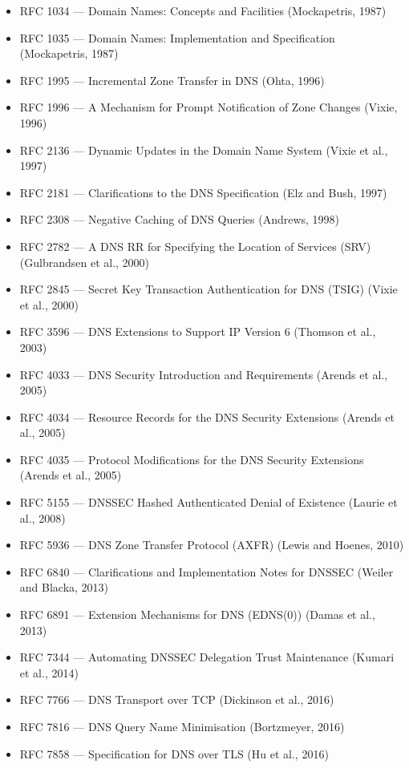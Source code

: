 \documentclass[11pt,letterpaper]{article}
\begin{document}
\begin{itemize}
  \item RFC 1034 --- Domain Names: Concepts and Facilities (Mockapetris, 1987)
  \item RFC 1035 --- Domain Names: Implementation and Specification (Mockapetris, 1987)
  \item RFC 1995 --- Incremental Zone Transfer in DNS (Ohta, 1996)
  \item RFC 1996 --- A Mechanism for Prompt Notification of Zone Changes (Vixie, 1996)
  \item RFC 2136 --- Dynamic Updates in the Domain Name System (Vixie et al., 1997)
  \item RFC 2181 --- Clarifications to the DNS Specification (Elz and Bush, 1997)
  \item RFC 2308 --- Negative Caching of DNS Queries (Andrews, 1998)
  \item RFC 2782 --- A DNS RR for Specifying the Location of Services (SRV) (Gulbrandsen et al., 2000)
  \item RFC 2845 --- Secret Key Transaction Authentication for DNS (TSIG) (Vixie et al., 2000)
  \item RFC 3596 --- DNS Extensions to Support IP Version 6 (Thomson et al., 2003)
  \item RFC 4033 --- DNS Security Introduction and Requirements (Arends et al., 2005)
  \item RFC 4034 --- Resource Records for the DNS Security Extensions (Arends et al., 2005)
  \item RFC 4035 --- Protocol Modifications for the DNS Security Extensions (Arends et al., 2005)
  \item RFC 5155 --- DNSSEC Hashed Authenticated Denial of Existence (Laurie et al., 2008)
  \item RFC 5936 --- DNS Zone Transfer Protocol (AXFR) (Lewis and Hoenes, 2010)
  \item RFC 6840 --- Clarifications and Implementation Notes for DNSSEC (Weiler and Blacka, 2013)
  \item RFC 6891 --- Extension Mechanisms for DNS (EDNS(0)) (Damas et al., 2013)
  \item RFC 7344 --- Automating DNSSEC Delegation Trust Maintenance (Kumari et al., 2014)
  \item RFC 7766 --- DNS Transport over TCP (Dickinson et al., 2016)
  \item RFC 7816 --- DNS Query Name Minimisation (Bortzmeyer, 2016)
  \item RFC 7858 --- Specification for DNS over TLS (Hu et al., 2016)

\end{itemize}
\end{document}
